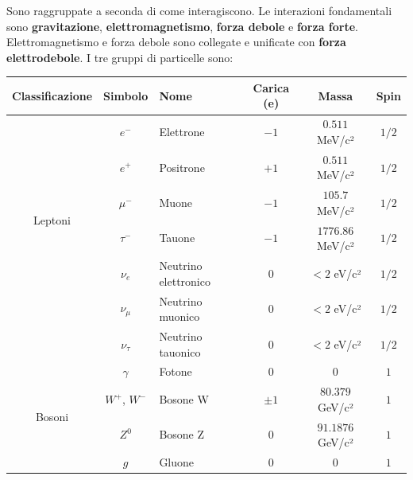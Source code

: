 \documentclass[10pt, a4paper]{scrartcl}
\numberwithin{equation}{subsection}
\theoremstyle{style1}
\begin{document}
Sono raggruppate a seconda di come interagiscono. Le interazioni fondamentali sono \textbf{gravitazione}, \textbf{elettromagnetismo}, \textbf{forza debole} e \textbf{forza forte}. Elettromagnetismo e forza debole sono collegate e unificate con \textbf{forza elettrodebole}. I tre gruppi di particelle sono:
\begin{table}[h!]
\centering
\begin{tabular}{|c|c|l|c|c|c|}
\hline
\textbf{Classificazione}        & \textbf{Simbolo}    & \textbf{Nome}            & \textbf{Carica (e)} & \textbf{Massa}         & \textbf{Spin} \\
\hline
\multirow{6}{*}{Leptoni}        & $e^-$               & Elettrone                & $-1$               & $0.511$ MeV/c²         & $1 /2 $ \\
			        & $e^+$               & Positrone                & $+1$               & $0.511$ MeV/c²         & $1 /2 $ \\
                                & $\mu^-$             & Muone                    & $-1$               & $105.7$ MeV/c²         & $1 / 2$ \\
                                & $\tau^-$            & Tauone                   & $-1$               & $1776.86$ MeV/c²       & $1 / 2$ \\
                                & $\nu_e$             & Neutrino elettronico     & $0$                & $<2$ eV/c²             & $1/2$ \\
                                & $\nu_\mu$           & Neutrino muonico         & $0$                & $<2$ eV/c²             & $1 / 2$ \\
                                & $\nu_\tau$          & Neutrino tauonico        & $0$                & $<2$ eV/c²             & $1 / 2$ \\
\hline
\multirow{5}{*}{Bosoni}         & $\gamma$            & Fotone                   & $0$                & $0$                    & $1$          \\
                                & $W^+$, $W^-$        & Bosone W                 & $\pm 1$            & $80.379$ GeV/c²        & $1$          \\
                                & $Z^0$               & Bosone Z                 & $0$                & $91.1876$ GeV/c²       & $1$          \\
                                & $g$                 & Gluone                   & $0$                & $0$                    & $1$          \\

\end{tabular}
\end{table}
\end{document}
